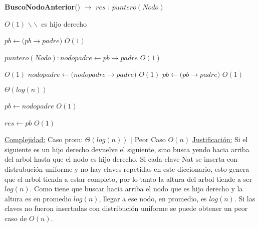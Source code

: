 \begin{algorithm}[H]{\textbf{BuscoNodoAnterior}() $\to$ $res$ : $puntero(Nodo)$}

	\begin{algorithmic}
		 \Comment $O(1)$
			\State $\backslash\backslash$ es hijo derecho

			\State $pb \gets (pb$$\rightarrow$$padre)$ \Comment $O(1)$

		\Else
				\State $puntero(Nodo): nodopadre \gets pb$$\rightarrow$$padre$ \Comment $O(1)$

				 \Comment $O(1)$
					\State $nodopadre \gets (nodopadre$$\rightarrow$$padre)$ \Comment $O(1)$
					\State $pb \gets (pb$$\rightarrow$$padre)$ \Comment $O(1)$

				\EndWhile \Comment $\Theta(log(n))$

				\State $pb \gets nodopadre$ \Comment $O(1)$

		\EndIf
		
		\State $res \gets pb$ \Comment $O(1)$

		\medskip
		\Statex \underline{Complejidad:} Caso prom: $\Theta(log(n))$ | Peor Caso $O(n)$
		\Statex \underline{Justificación:} Si el siguiente es un hijo derecho devuelve el siguiente, sino busca yendo hacia arriba del arbol hasta que el nodo es hijo derecho. Si cada clave Nat se inserta con distrubución uniforme y no hay claves repetidas en este diccionario, esto genera que el arbol tienda a estar completo, por lo tanto la altura del arbol tiende a ser $log(n)$. Como tiene que buscar hacia arriba el nodo que es hijo derecho y la altura es en promedio $log(n)$, llegar a ese nodo, en promedio, es $log(n)$. Si las claves no fueron insertadas con distribución uniforme se puede obtener un peor caso de $O(n)$.

    \end{algorithmic}
\end{algorithm}



